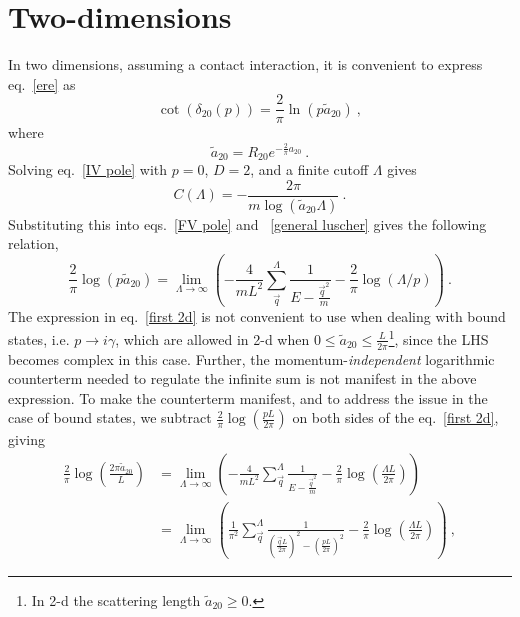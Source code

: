 \section{Two-dimensions}
In two dimensions, assuming a contact interaction, it is convenient to express eq.~\eqref{ere} as
\begin{equation}
\cot \left(\delta_{20}(p)\right)=\frac{2}{\pi}  \ln \left(p \tilde a_{20}\right)\ ,
\end{equation}
where
\begin{equation}
\tilde a_{20}=R_{20}e^{-\frac{2}{\pi}a_{20}}\ .
\end{equation}
Solving eq.~\eqref{IV pole} with $p=0$, $D=2$, and a finite cutoff $\Lambda$ gives
\begin{equation}\label{eq:C2}
C(\Lambda)=-\frac{2 \pi}{m \log \left(\tilde a_{20} \Lambda\right)}\ .
\end{equation}
Substituting this into eqs.~\eqref{FV pole} and ~\eqref{general luscher} gives the following relation,
\begin{equation}\label{eq:first 2d}
\frac{2}{\pi} \log \left(p\tilde a_{20}\right)=\lim_{\Lambda\to\infty}\left(-\frac{4}{m L^{2}} \sum_{\vec{q}}^{\Lambda} \frac{1}{E-\frac{\vec{q}^{2}}{m}}-\frac{2}{\pi} \log (\Lambda / p)\right)\ .
\end{equation}
The expression in eq.~\eqref{first 2d} is not convenient to use when dealing with bound states, i.e. $p\to i\gamma$, which are allowed in 2-d when $0\le \tilde a_{20}\le \frac{L}{2\pi}$\footnote{ In 2-d the scattering length $\tilde a_{20}\ge 0$\cite{}.}, since the LHS becomes complex in this case.  Further, the momentum-\emph{independent} logarithmic counterterm needed to regulate the infinite sum is not manifest in the above expression.  To make the counterterm manifest, and to address the issue in the case of bound states, we subtract $\frac{2}{\pi}\log\left(\frac{pL}{2\pi}\right)$ on both sides of the eq.~\eqref{first 2d}, giving
\begin{align}
\frac{2}{\pi} \log \left(\frac{2\pi \tilde a_{20}}{L}\right)&=\lim_{\Lambda\to\infty}\left(-\frac{4}{m L^{2}} \sum_{\vec{q}}^{\Lambda} \frac{1}{E-\frac{\vec{q}^{2}}{m}}-\frac{2}{\pi} \log \left(\frac{\Lambda L}{2\pi}\right)\right)\nonumber\\
&=\lim_{\Lambda\to\infty}\left(\frac{1}{\pi^2} \sum_{\vec{q}}^{\Lambda} \frac{1}{\left(\frac{\vec{q}L}{2\pi}\right)^2-\left(\frac{pL}{2\pi}\right)^2}-\frac{2}{\pi} \log \left(\frac{\Lambda L}{2\pi}\right)\right)\ ,\label{eq:second 2d}
\end{align}

